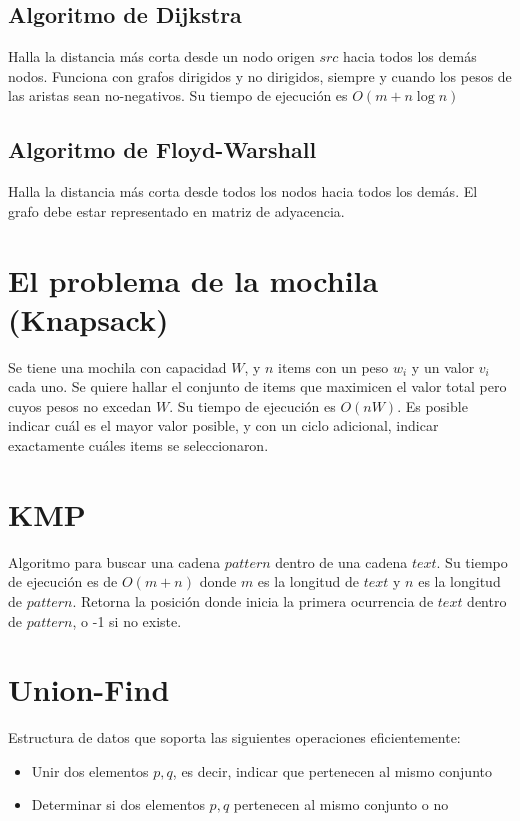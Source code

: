 \documentclass{article}
\begin{document}
\begin{multicols}{2}
	\subsection{Algoritmo de Dijkstra}
	Halla la distancia más corta desde un nodo origen \(src\) hacia todos los demás nodos. Funciona con grafos dirigidos y no dirigidos, siempre y cuando los pesos de las aristas sean no-negativos. Su tiempo de ejecución es \( O(m + n\log n) \)
	
	
	\subsection{Algoritmo de Floyd-Warshall}
	Halla la distancia más corta desde todos los nodos hacia todos los demás. El grafo debe estar representado en matriz de adyacencia.

\section{El problema de la mochila (Knapsack)}
Se tiene una mochila con capacidad \(W\), y \(n\) items con un peso \(w_i\) y un valor \(v_i\) cada uno. Se quiere hallar el conjunto de items que maximicen el valor total pero cuyos pesos no excedan \(W\). Su tiempo de ejecución es \( O(nW) \). Es posible indicar cuál es el mayor valor posible, y con un ciclo adicional, indicar exactamente cuáles items se seleccionaron.


\section{KMP}
Algoritmo para buscar una cadena \(pattern\) dentro de una cadena \(text\). Su tiempo de ejecución es de \( O(m+n) \) donde \(m\) es la longitud de \(text\) y \(n\) es la longitud de \(pattern\). Retorna la posición donde inicia la primera ocurrencia de \(text\) dentro de \(pattern\), o -1 si no existe.


\section{Union-Find}
Estructura de datos que soporta las siguientes operaciones eficientemente:
\begin{itemize}
\item Unir dos elementos \(p,q\), es decir, indicar que pertenecen al mismo conjunto
\item Determinar si dos elementos \(p,q\) pertenecen al mismo conjunto o no
\end{itemize}



\end{multicols}
\end{document}
